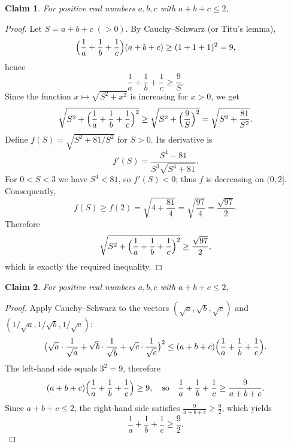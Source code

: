 \documentclass{article}
\newtheorem{claim}{Claim}
\begin{document}
\begin{claim}  %
For positive real numbers $a,b,c$ with $a+b+c\le 2$,
\end{claim}
\begin{proof}
Let $S=a+b+c\;(>0)$. By Cauchy–Schwarz (or Titu's lemma), \[ \Bigl(\frac1a+\frac1b+\frac1c\Bigr)(a+b+c)\ge (1+1+1)^2=9, \] hence \[ \frac1a+\frac1b+\frac1c\ge\frac{9}{S}. \] Since the function $x\mapsto\sqrt{S^2+x^2}$ is increasing for $x>0$, we get \[ \sqrt{S^2+\Bigl(\frac1a+\frac1b+\frac1c\Bigr)^2} \ge\sqrt{S^2+\Bigl(\frac{9}{S}\Bigr)^2} =\sqrt{S^2+\frac{81}{S^2}}. \] Define $f(S)=\sqrt{S^2+81/S^2}$ for $S>0$. Its derivative is \[ f'(S)=\frac{S^4-81}{S^3\sqrt{S^4+81}}. \] For $0<S<3$ we have $S^4<81$, so $f'(S)<0$; thus $f$ is decreasing on $(0,2]$. Consequently, \[ f(S)\ge f(2)=\sqrt{4+\frac{81}{4}}=\sqrt{\frac{97}{4}}=\frac{\sqrt{97}}2. \] Therefore \[ \sqrt{S^2+\Bigl(\frac1a+\frac1b+\frac1c\Bigr)^2}\ge\frac{\sqrt{97}}2, \] which is exactly the required inequality.
\end{proof}

\begin{claim}  %
For positive real numbers $a,b,c$ with $a+b+c\le 2$,
\end{claim}
\begin{proof}
Apply Cauchy–Schwarz to the vectors $(\sqrt a,\sqrt b,\sqrt c)$ and $(1/\sqrt a,1/\sqrt b,1/\sqrt c)$: \[ \bigl(\sqrt a\cdot\frac1{\sqrt a}+\sqrt b\cdot\frac1{\sqrt b}+\sqrt c\cdot\frac1{\sqrt c}\bigr)^2 \le (a+b+c)\Bigl(\frac1a+\frac1b+\frac1c\Bigr). \] The left‑hand side equals $3^2=9$, therefore \[ (a+b+c)\Bigl(\frac1a+\frac1b+\frac1c\Bigr)\ge9, \quad\text{so}\quad \frac1a+\frac1b+\frac1c\ge\frac{9}{a+b+c}. \] Since $a+b+c\le2$, the right‑hand side satisfies $\frac{9}{a+b+c}\ge\frac{9}{2}$, which yields \[ \frac1a+\frac1b+\frac1c\ge\frac92. \]
\end{proof}
\end{document}
